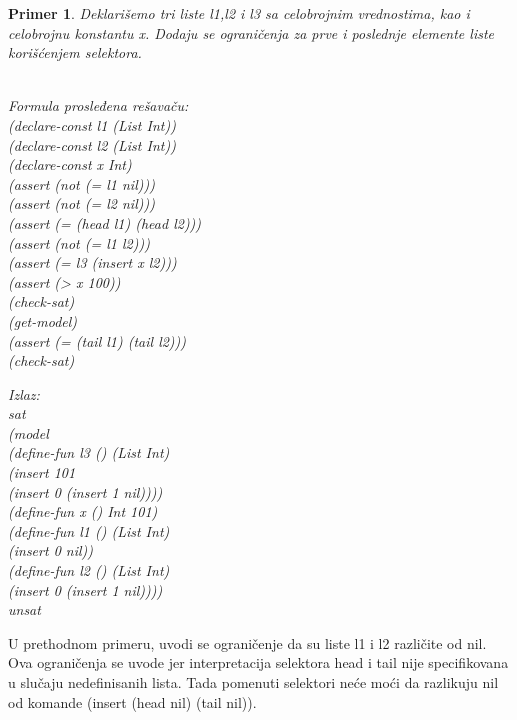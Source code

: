 \documentclass[12pt,oneside]{memoir}
\newtheorem{primer}{Primer}
\begin{document}
\begin{primer} Deklarišemo tri liste l1,l2 i l3 sa celobrojnim vrednostima, kao i celobrojnu konstantu x. Dodaju se ograničenja za prve i poslednje elemente liste korišćenjem selektora. 
\\ \\
\begin{minipage}[b]{0.5\textwidth}
Formula prosleđena rešavaču:
\\(declare-const l1 (List Int))
\\(declare-const l2 (List Int))
\\(declare-const x Int)
\\(assert (not (= l1 nil)))
\\(assert (not (= l2 nil)))
\\(assert (= (head l1) (head l2)))
\\(assert (not (= l1 l2)))
\\(assert (= l3 (insert x l2)))
\\(assert (> x 100))
\\(check-sat)
\\(get-model)
\\(assert (= (tail l1) (tail l2)))
\\(check-sat)
\end{minipage}
\hspace{2.2cm}
\begin{minipage}[t]{0.5\textwidth}
\vspace{-8.45cm}
Izlaz:
\\sat 
\\(model 
\\(define-fun l3 () (List Int) 
\\(insert 101 
\\(insert 0 (insert 1 nil)))) 
\\(define-fun x () Int 101) 
\\(define-fun l1 () (List Int) 
\\(insert 0 nil)) 
\\(define-fun l2 () (List Int) 
\\(insert 0 (insert 1 nil)))) 
\\unsat
\end{minipage}


\end{primer}

U prethodnom primeru, uvodi se ograničenje da su liste l1 i l2 različite od nil. Ova ograničenja se uvode jer interpretacija selektora head i tail 
nije specifikovana u slučaju nedefinisanih lista.
Tada pomenuti selektori neće moći da razlikuju nil od komande (insert (head nil) (tail nil)).
\end{document}
